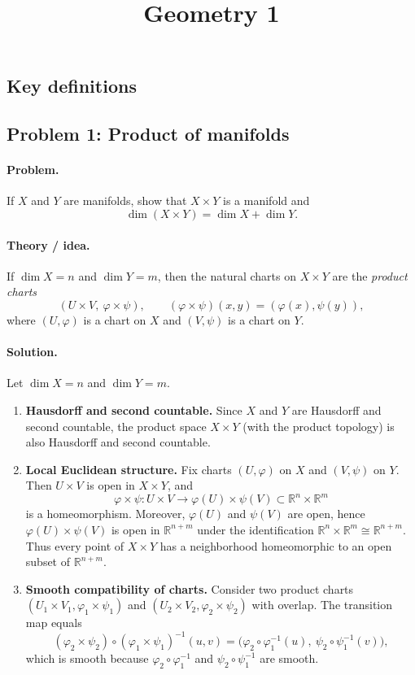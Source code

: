 \documentclass[12pt,a4paper]{article}
\title{Geometry 1}
\author{}
\date{}
\theoremstyle{plain}
\theoremstyle{definition}      %
\begin{document}
	\maketitle
	

\subsection*{Key definitions}

\subsection*{Problem 1: Product of manifolds}
\paragraph{Problem.}
If $X$ and $Y$ are manifolds, show that $X\times Y$ is a manifold and
\[
\dim(X\times Y)=\dim X+\dim Y.
\]

\paragraph{Theory / idea.}
If $\dim X=n$ and $\dim Y=m$, then the natural charts on $X\times Y$ are the
\emph{product charts}
\[
(U\times V,\ \varphi\times\psi),\qquad (\varphi\times\psi)(x,y)=(\varphi(x),\psi(y)),
\]
where $(U,\varphi)$ is a chart on $X$ and $(V,\psi)$ is a chart on $Y$.

\paragraph{Solution.}
Let $\dim X=n$ and $\dim Y=m$.

\begin{enumerate}
	\item \textbf{Hausdorff and second countable.}
	Since $X$ and $Y$ are Hausdorff and second countable, the product space
	$X\times Y$ (with the product topology) is also Hausdorff and second countable.
	
	\item \textbf{Local Euclidean structure.}
	Fix charts $(U,\varphi)$ on $X$ and $(V,\psi)$ on $Y$. Then $U\times V$ is open in
	$X\times Y$, and
	\[
	\varphi\times\psi:U\times V\longrightarrow \varphi(U)\times\psi(V)\subset \mathbb{R}^n\times\mathbb{R}^m
	\]
	is a homeomorphism. Moreover, $\varphi(U)$ and $\psi(V)$ are open, hence
	$\varphi(U)\times\psi(V)$ is open in $\mathbb{R}^{n+m}$ under the identification
	$\mathbb{R}^n\times\mathbb{R}^m\cong\mathbb{R}^{n+m}$.
	Thus every point of $X\times Y$ has a neighborhood homeomorphic to an open subset
	of $\mathbb{R}^{n+m}$.
	
	\item \textbf{Smooth compatibility of charts.}
	Consider two product charts $(U_1\times V_1,\varphi_1\times\psi_1)$ and
	$(U_2\times V_2,\varphi_2\times\psi_2)$ with overlap. The transition map equals
	\[
	(\varphi_2\times\psi_2)\circ(\varphi_1\times\psi_1)^{-1}(u,v)
	=\big(\varphi_2\circ\varphi_1^{-1}(u),\ \psi_2\circ\psi_1^{-1}(v)\big),
	\]
	which is smooth because $\varphi_2\circ\varphi_1^{-1}$ and $\psi_2\circ\psi_1^{-1}$
	are smooth.
\end{enumerate}
\end{document}
